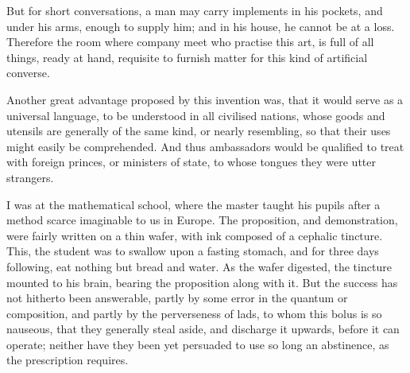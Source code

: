 \documentclass[12pt]{article}
\begin{document}
But for short conversations, a man may carry implements in his pockets, and under his arms, enough to supply him; and in his house, he cannot be at a loss.  Therefore the room where company meet who practise this art, is full of all things, ready at hand, requisite to furnish matter for this kind of artificial converse.

Another great advantage proposed by this invention was, that it would serve as a universal language, to be understood in all civilised nations, whose goods and utensils are generally of the same kind, or nearly resembling, so that their uses might easily be comprehended.  And thus ambassadors would be qualified to treat with foreign princes, or ministers of state, to whose tongues they were utter strangers.

I was at the mathematical school, where the master taught his pupils after a method scarce imaginable to us in Europe.  The proposition, and demonstration, were fairly written on a thin wafer, with ink composed of a cephalic tincture.  This, the student was to swallow upon a fasting stomach, and for three days following, eat nothing but bread and water.  As the wafer digested, the tincture mounted to his brain, bearing the proposition along with it.  But the success has not hitherto been answerable, partly by some error in the quantum or composition, and partly by the perverseness of lads, to whom this bolus is so nauseous, that they generally steal aside, and discharge it upwards, before it can operate; neither have they been yet persuaded to use so long an abstinence, as the prescription requires.

\end{document}

